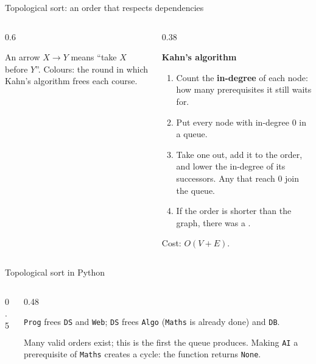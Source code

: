 \documentclass[aspectratio=169,10pt]{beamer}
\begin{document}
\begin{frame}{Topological sort: an order that respects dependencies}
\begin{columns}[T]
\begin{column}{0.6\textwidth}
\begin{sfig}[0.55]
\end{sfig}
{\small An arrow $X\to Y$ means ``take $X$ before $Y$''. Colours: the round in which Kahn's algorithm frees each course.}
\end{column}
\begin{column}{0.38\textwidth}
{\small
\textbf{Kahn's algorithm}
\begin{enumerate}\setlength\itemsep{2pt}
\item Count the \textbf{in-degree} of each node: how many prerequisites it still waits for.
\item Put every node with in-degree 0 in a queue.
\item Take one out, add it to the order, and lower the in-degree of its successors. Any that reach 0 join the queue.
\item If the order is shorter than the graph, there was a .
\end{enumerate}
Cost: $O(V+E)$.}
\end{column}
\end{columns}
\end{frame}

\begin{frame}{Topological sort in Python}
\begin{columns}[T]
\begin{column}{0.5\textwidth}
\end{column}
\begin{column}{0.48\textwidth}
\vspace{2mm}
{\small
\texttt{Prog} frees \texttt{DS} and \texttt{Web}; \texttt{DS} frees \texttt{Algo} (\texttt{Maths} is already done) and \texttt{DB}.

\vspace{1mm}
Many valid orders exist; this is the first the queue produces. Making \texttt{AI} a prerequisite of \texttt{Maths} creates a cycle: the function returns \texttt{None}.}
\end{column}
\end{columns}
\end{frame}
\end{document}
